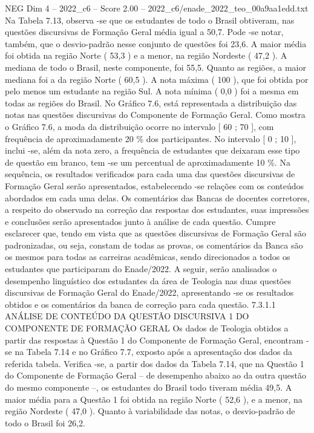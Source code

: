 \begin{textsample}{NEG Dim 4 – 2022\_c6 – Score 2.00 – 2022\_c6/enade\_2022\_teo\_00a9aa1edd.txt}
Na Tabela 7.13, observa -se que os estudantes de todo o Brasil obtiveram, nas questões discursivas de Formação Geral média igual a 50,7.
Pode -se notar, também, que o desvio-padrão nesse conjunto de questões foi 23,6.
A maior média foi obtida na região Norte ( 53,3 ) e a menor, na região Nordeste ( 47,2 ).
A mediana de todo o Brasil, neste componente, foi 55,5.
Quanto as regiões, a maior mediana foi a da região Norte ( 60,5 ).
A nota máxima ( 100 ), que foi obtida por pelo menos um estudante na região Sul.
A nota mínima ( 0,0 ) foi a mesma em todas as regiões do Brasil.
No Gráfico 7.6, está representada a distribuição das notas nas questões discursivas do Componente de Formação Geral.
Como mostra o Gráfico 7.6, a moda da distribuição ocorre no intervalo [ 60 ; 70 ], com frequência de aproximadamente 20 \% dos participantes.
No intervalo [ 0 ; 10 ], inclui -se, além da nota zero, a frequência de estudantes que deixaram esse tipo de questão em branco, tem -se um percentual de aproximadamente 10 \%.
Na sequência, os resultados verificados para cada uma das questões discursivas de Formação Geral serão apresentados, estabelecendo -se relações com os conteúdos abordados em cada uma delas.
Os comentários das Bancas de docentes corretores, a respeito do observado na correção das respostas dos estudantes, suas impressões e conclusões serão apresentados junto à análise de cada questão.
Cumpre esclarecer que, tendo em vista que as questões discursivas de Formação Geral são padronizadas, ou seja, constam de todas as provas, os comentários da Banca são os mesmos para todas as carreiras acadêmicas, sendo direcionados a todos os estudantes que participaram do Enade/2022.
A seguir, serão analisados o desempenho linguístico dos estudantes da área de Teologia nas duas questões discursivas de Formação Geral do Enade/2022, apresentando -se os resultados obtidos e os comentários da banca de correção para cada questão. 7.3.1.1 ANÁLISE DE CONTEÚDO DA QUESTÃO DISCURSIVA 1 DO COMPONENTE DE FORMAÇÃO GERAL Os dados de Teologia obtidos a partir das respostas à Questão 1 do Componente de Formação Geral, encontram -se na Tabela 7.14 e no Gráfico 7.7, exposto após a apresentação dos dados da referida tabela.
Verifica -se, a partir dos dados da Tabela 7.14, que na Questão 1 do Componente de Formação Geral – de desempenho abaixo ao da outra questão do mesmo componente –, os estudantes do Brasil todo tiveram média 49,5.
A maior média para a Questão 1 foi obtida na região Norte ( 52,6 ), e a menor, na região Nordeste ( 47,0 ).
Quanto à variabilidade das notas, o desvio-padrão de todo o Brasil foi 26,2.

\end{textsample}
